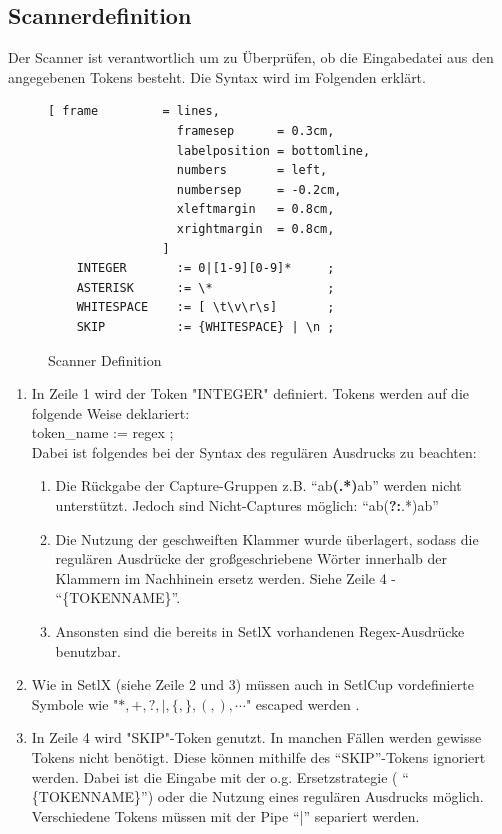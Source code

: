 \subsection{Scannerdefinition}
Der Scanner ist verantwortlich um zu Überprüfen, ob die Eingabedatei aus den angegebenen Tokens besteht. Die Syntax wird im Folgenden erklärt.
\begin{figure}[!ht]
\begin{Verbatim}[ frame         = lines, 
                  framesep      = 0.3cm, 
                  labelposition = bottomline,
                  numbers       = left,
                  numbersep     = -0.2cm,
                  xleftmargin   = 0.8cm,
                  xrightmargin  = 0.8cm,
                ]
	INTEGER       := 0|[1-9][0-9]*     ;
	ASTERISK      := \*                ;
	WHITESPACE    := [ \t\v\r\s]       ;
	SKIP          := {WHITESPACE} | \n ;
\end{Verbatim}
\caption{Scanner Definition}
\label{fig:scanner_def}
\end{figure}
\begin{enumerate}
	\item In Zeile 1 wird der Token "INTEGER" definiert. Tokens werden auf die folgende Weise deklariert:\\
					token\_name := regex ; \\
					Dabei ist folgendes bei der Syntax des regulären Ausdrucks zu beachten:
					\begin{enumerate}
						\item Die Rückgabe der Capture-Gruppen z.B. "`ab\textbf{(.*)}ab"'	werden nicht unterstützt. Jedoch sind Nicht-Captures möglich: "`ab(\textbf{?:}.*)ab"'
						\item Die Nutzung der geschweiften Klammer wurde überlagert, sodass die regulären Ausdrücke der großgeschriebene Wörter innerhalb der Klammern im Nachhinein ersetz werden. Siehe Zeile 4 - "`\{TOKENNAME\}"'.
						\item Ansonsten sind die bereits in SetlX vorhandenen Regex-Ausdrücke benutzbar.
					\end{enumerate}
	\item Wie in SetlX (siehe Zeile 2 und 3) müssen auch in SetlCup vordefinierte Symbole wie "$*,+,?,|,\{,\},(,),\cdots$" escaped werden .
	\item In Zeile 4 wird "SKIP"-Token genutzt. In manchen Fällen werden gewisse Tokens nicht benötigt. Diese können mithilfe des "`SKIP"'-Tokens ignoriert werden. Dabei ist die Eingabe mit der o.g. Ersetzstrategie ( "` \{TOKENNAME\}"') oder die Nutzung eines regulären Ausdrucks möglich. Verschiedene Tokens müssen mit der Pipe "`|"' separiert werden.
\end{enumerate}

